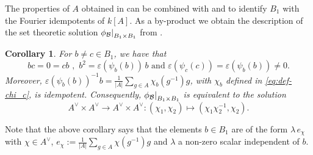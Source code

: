 \documentclass[a4paper,10pt]{amsart}
\newtheorem{corollary}[lemma]{Corollary}
\theoremstyle{definition}
\theoremstyle{remark}
\newcommand\eps{\varepsilon}
\newcommand\mc{\mathcal}
\newcommand\restr[2]{{%
   \left.\kern-\nulldelimiterspace %
   #1 %
   \right|_{#2} %
   }}
\begin{document}
The properties of $A$ obtained in  can be combined with  and  to identify $B_1$ with the Fourier idempotents of $k[A]$. As a by-product we obtain the description of the set theoretic solution $\restr{\phi_{\mc{B}}}{B_1 \times B_1}$ from .

\begin{corollary}\label{B_1 and Fourier}
For $b \neq c \in B_1$, we have that 
$$bc =0 = cb\,\, ,\,\, b^2 = \eps(\psi_b(b)) \, b \text{ and } \eps(\psi_c(c)) = \eps(\psi_b(b)) \neq 0.$$ 
Moreover, $\eps(\psi_b(b))^{-1}b = \frac{1}{|A|} \sum_{g \in A}\chi_b(g^{-1})g$, with $\chi_b$ defined in \eqref{eq:def-chi_c}, is idempotent. Consequently, $\restr{\phi_{\mc{B}}}{B_1 \times B_1}$ is equivalent to the solution 
$$A^{\vee} \times A^{\vee} \rightarrow A^{\vee} \times A^{\vee}: (\chi_1,\chi_2) \mapsto (\chi_1\chi_2^{-1},\chi_2).$$
\end{corollary}
Note that the above corollary says that the elements $b\in B_1$ are of the form $\lambda \, e_{\chi}$ with $\chi \in A^{\vee}$, $e_{\chi} := \frac{1}{|A|} \sum_{g \in A}\chi(g^{-1})g $ and $\lambda$ a non-zero scalar independent of $b$. 
\end{document}
